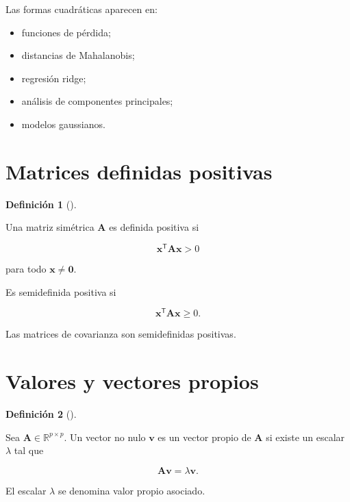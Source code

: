 \documentclass[
  spanish,
  11pt,
  letterpaper,
  DIV=11,
  numbers=noendperiod]{scrreprt}
\providecommand{\tightlist}{%
  \setlength{\itemsep}{0pt}\setlength{\parskip}{0pt}}
\theoremstyle{definition}
\newtheorem{definition}{Definición}[chapter]
\theoremstyle{plain}
\theoremstyle{definition}
\theoremstyle{remark}
\begin{document}
Las formas cuadráticas aparecen en:

\begin{itemize}
\tightlist
\item
  funciones de pérdida;
\item
  distancias de Mahalanobis;
\item
  regresión ridge;
\item
  análisis de componentes principales;
\item
  modelos gaussianos.
\end{itemize}

\section{Matrices definidas
positivas}\label{matrices-definidas-positivas}

\begin{definition}[]\protect\hypertarget{def-definida-positiva}{}\label{def-definida-positiva}

Una matriz simétrica \(\mathbf{A}\) es definida positiva si

\[
\mathbf{x}^{\mathsf T}\mathbf{A}\mathbf{x}>0
\]

para todo \(\mathbf{x}\neq\mathbf{0}\).

\end{definition}

Es semidefinida positiva si

\[
\mathbf{x}^{\mathsf T}\mathbf{A}\mathbf{x}\geq 0.
\]

Las matrices de covarianza son semidefinidas positivas.

\section{Valores y vectores propios}\label{valores-y-vectores-propios}

\begin{definition}[]\protect\hypertarget{def-valor-vector-propio}{}\label{def-valor-vector-propio}

Sea \(\mathbf{A}\in\mathbb{R}^{p\times p}\). Un vector no nulo
\(\mathbf{v}\) es un vector propio de \(\mathbf{A}\) si existe un
escalar \(\lambda\) tal que

\[
\mathbf{A}\mathbf{v}
=
\lambda\mathbf{v}.
\]

El escalar \(\lambda\) se denomina valor propio asociado.

\end{definition}
\end{document}
